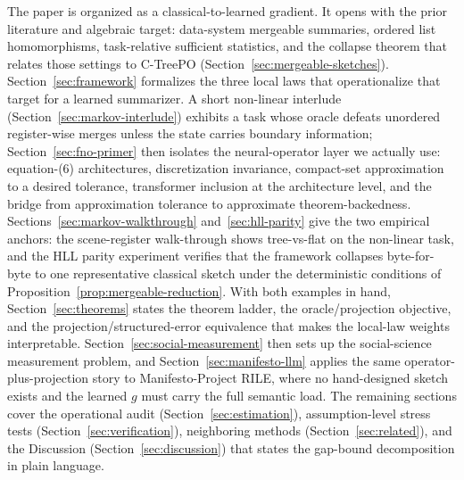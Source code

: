 The paper is organized as a classical-to-learned gradient. It opens with the prior literature and algebraic target: data-system mergeable summaries, ordered list homomorphisms, task-relative sufficient statistics, and the collapse theorem that relates those settings to C-TreePO (Section~\ref{sec:mergeable-sketches}). Section~\ref{sec:framework} formalizes the three local laws that operationalize that target for a learned summarizer. A short non-linear interlude (Section~\ref{sec:markov-interlude}) exhibits a task whose oracle defeats unordered register-wise merges unless the state carries boundary information; Section~\ref{sec:fno-primer} then isolates the neural-operator layer we actually use: equation-(6) architectures, discretization invariance, compact-set approximation to a desired tolerance, transformer inclusion at the architecture level, and the bridge from approximation tolerance to approximate theorem-backedness. Sections~\ref{sec:markov-walkthrough} and~\ref{sec:hll-parity} give the two empirical anchors: the scene-register walk-through shows tree-vs-flat on the non-linear task, and the HLL parity experiment verifies that the framework collapses byte-for-byte to one representative classical sketch under the deterministic conditions of Proposition~\ref{prop:mergeable-reduction}. With both examples in hand, Section~\ref{sec:theorems} states the theorem ladder, the oracle/projection objective, and the projection/structured-error equivalence that makes the local-law weights interpretable. Section~\ref{sec:social-measurement} then sets up the social-science measurement problem, and Section~\ref{sec:manifesto-llm} applies the same operator-plus-projection story to Manifesto-Project RILE, where no hand-designed sketch exists and the learned $g$ must carry the full semantic load. The remaining sections cover the operational audit (Section~\ref{sec:estimation}), assumption-level stress tests (Section~\ref{sec:verification}), neighboring methods (Section~\ref{sec:related}), and the Discussion (Section~\ref{sec:discussion}) that states the gap-bound decomposition in plain language.
